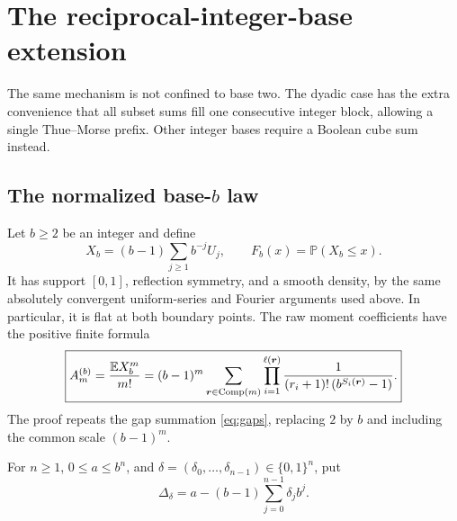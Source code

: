 \documentclass[11pt,oneside]{article}
\theoremstyle{definition}\newtheorem{definition}[theorem]{Definition}
\theoremstyle{remark}\newtheorem{remark}[theorem]{Remark}
\newcommand{\Prob}{\mathbb P}\newcommand{\Up}{\operatorname{up}}
\begin{document}
\section{The reciprocal-integer-base extension}
\label{sec:integerbase}

The same mechanism is not confined to base two. The dyadic case has the
extra convenience that all subset sums fill one consecutive integer block,
allowing a single Thue--Morse prefix. Other integer bases require a Boolean
cube sum instead.

\subsection{The normalized \texorpdfstring{base-$b$}{base-b} law}
Let $b\ge2$ be an integer and define
\begin{equation}
 X_b=(b-1)\sum_{j\ge1}b^{-j}U_j,\qquad
 F_b(x)=\Prob(X_b\le x).
 \label{eq:baselaw}
\end{equation}
It has support $[0,1]$, reflection symmetry, and a smooth density, by the
same absolutely convergent uniform-series and Fourier arguments used
above. In particular, it is flat at both boundary points. The raw moment
coefficients have the positive finite formula
\begin{equation}
 \boxed{\displaystyle
 A_m^{(b)}=\frac{\mathbb E X_b^m}{m!}
 =(b-1)^m\sum_{\boldsymbol r\in\operatorname{Comp}(m)}
       \prod_{i=1}^{\ell(\boldsymbol r)}
       \frac{1}{(r_i+1)!\,(b^{S_i(\boldsymbol r)}-1)}.}
 \label{eq:basecoeff}
\end{equation}
The proof repeats the gap summation \eqref{eq:gaps}, replacing $2$ by
$b$ and including the common scale $(b-1)^m$.

For $n\ge1$, $0\le a\le b^n$, and
$\delta=(\delta_0,\ldots,\delta_{n-1})\in\{0,1\}^n$, put
\begin{equation}
 \Delta_\delta=a-(b-1)\sum_{j=0}^{n-1}\delta_j b^j.
 \label{eq:basedelta}
\end{equation}
\end{document}
